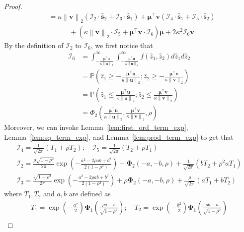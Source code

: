 \documentclass[10pt,a4paper]{amsart}
\def\bfs{{\mathbf{s}}}\def\bft{{\mathbf{t}}}
\def\bfu{{\mathbf{u}}}\def\bfv{{\mathbf{v}}}\def\bfw{{\mathbf{w}}}\def\bfx{{\mathbf{x}}}
\def\bfv{{\mathbf{v}}}\def\bfw{{\mathbf{w}}}\def\bfx{{\mathbf{x}}}
\newcommand{\norm}[1]{\left\|#1\right\|}
\newcommand{\paren}[1]{\left(#1\right)}
\begin{document}
\begin{proof}
\begin{equation}
\begin{aligned}
            & = \kappa\norm{\bfv}_2\paren{\mathcal{I}_2\cdot\hat{\bfs}_2 + \mathcal{I}_3\cdot\hat{\bfs}_1} + \bm{\mu}^\top\bfv\paren{\mathcal{I}_4\cdot\hat{\bfs}_1+\mathcal{I}_5\cdot\hat{\bfs}_2}\\
            & \quad\quad\quad + \paren{\kappa\norm{\bfv}_2\cdot\mathcal{I}_5 + \bm{\mu}^\top\bfv\cdot\mathcal{I}_6}\bm{\mu} + 2\kappa^2\mathcal{I}_6\bfv
        \end{aligned}
    \end{equation}
    By the definition of $\mathcal{I}_2$ to $\mathcal{I}_6$, we first notice that
    \begin{align*}
        \mathcal{I}_6 & = \int_{-\frac{\bm{\mu}^\top\bfu}{\kappa\norm{\bfu}_2}}^\infty\int_{-\frac{\bm{\mu}^\top\bfu}{\kappa\norm{\bfu}_2}}^\infty f(\hat{z}_1,\hat{z}_2)d\hat{z}_1d\hat{z}_2\\
        & = \mathbb{P}\paren{\hat{z}_1 \geq -\frac{\bm{\mu}^\top\bfu}{\kappa\norm{\bfu}_2};\hat{z}_2\geq -\frac{\bm{\mu}^\top\bfv}{\kappa\norm{\bfv}_2}}\\
        & = \mathbb{P}\paren{\hat{z}_1\leq\frac{\bm{\mu}^\top\bfu}{\kappa\norm{\bfu}_2};\hat{z}_2\leq \frac{\bm{\mu}^\top\bfv}{\kappa\norm{\bfv}_2}}\\
        & = \Phi_2\paren{\frac{\bm{\mu}^\top\bfu}{\kappa\norm{\bfu}_2},\frac{\bm{\mu}^\top\bfv}{\kappa\norm{\bfv}_2},\rho}
    \end{align*}
    Moreover, we can invoke Lemma~\ref{lem:first_ord_term_exp}, Lemma~\ref{lem:sq_term_exp}, and Lemma~\ref{lem:prod_term_exp} to get that
    \begin{gather*}
        \mathcal{I}_4 =\frac{1}{\sqrt{2\pi}}\paren{T_1 + \rho T_2};\quad \mathcal{I}_5 = \frac{1}{\sqrt{2\pi}}\paren{T_2 + \rho T_1}\\
        \mathcal{I}_2 = \frac{\rho\sqrt{1-\rho^2}}{2\pi}\exp\paren{-\frac{a^2 - 2\rho ab + b^2}{2\paren{1-\rho^2}}} + \bm{\Phi}_2\paren{-a,-b,\rho} + \frac{1}{\sqrt{2\pi}}\paren{bT_2 + \rho^2 aT_1}\\
        \mathcal{I}_3 =  \frac{\sqrt{1-\rho^2}}{2\pi}\exp\paren{-\frac{a^2 - 2\rho ab + b^2}{2\paren{1-\rho^2}}} + \rho\bm{\Phi}_2\paren{-a,-b,\rho} + \frac{\rho}{\sqrt{2\pi}}\paren{aT_1 + bT_2}
    \end{gather*}
    where $T_1, T_2$ and $a, b$ are defined as
    \begin{gather*}
        T_1 = \exp\paren{-\frac{a^2}{2}}\bm{\Phi}_1\paren{\frac{\rho a - b}{\sqrt{1 - \rho^2}}};\quad T_2 = \exp\paren{-\frac{b^2}{2}}\bm{\Phi}_1\paren{\frac{\rho b - a}{\sqrt{1 - \rho^2}}}\\

\end{gather*}
\end{proof}
\end{document}
